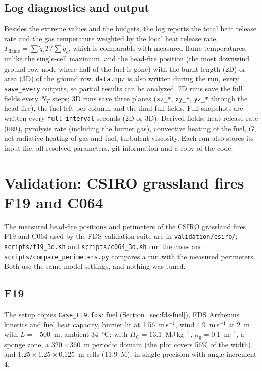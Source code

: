 \documentclass[11pt,a4paper]{article}
\newcommand{\code}[1]{\texttt{#1}}
\begin{document}
\subsection{Log diagnostics and output}
Besides the extreme values and the budgets, the log reports the total heat release rate and the gas
temperature weighted by the local heat release rate, $T_\text{flame}=\sum\dot q_\text{c} T/\sum\dot q_\text{c}$, which is
comparable with measured flame temperatures, unlike the single-cell maximum, and the head-fire position
(the most downwind ground-row node where half of the fuel is gone) with the burnt length (2D) or area (3D)
of the ground row. \code{data.npz} is also written during the run, every \code{save\_every} outputs, so
partial results can be analyzed. 2D runs save the full
fields every $N_T$ steps; 3D runs save three planes (\code{xz\_*}, \code{xy\_*}, \code{yz\_*} through the
head fire), the fuel left per column and the final full fields. Full snapshots are written every
\code{full\_interval} seconds (2D or 3D). Derived fields: heat release rate (\code{HRR}), pyrolysis
rate (including the burner gas), convective heating of the fuel, $G$, net radiative heating of gas and
fuel, turbulent viscosity. Each run also stores its input file, all resolved parameters, git
information and a copy of the code.

\section{Validation: CSIRO grassland fires F19 and C064}\label{sec:validation}
The measured head-fire positions and perimeters of the CSIRO grassland fires F19 and C064 used by the FDS
validation suite are in \code{validation/csiro/}; \code{scripts/f19\_3d.sh} and \code{scripts/c064\_3d.sh}
run the cases and \code{scripts/compare\_perimeters.py} compares a run with the measured perimeters. Both
use the same model settings, and nothing was tuned.

\subsection{F19}
The setup copies \code{Case\_F19.fds}: fuel
(Section~\ref{sec:fds-fuel}), FDS Arrhenius kinetics and fuel heat capacity, burner lit at 1.56~m\,s$^{-1}$, wind
4.9~m\,s$^{-1}$ at 2~m with $L=-500$~m, ambient 34~$^\circ$C; with $H_\text{C}=13.1$~MJ\,kg$^{-1}$, $\kappa_\text{g}=0.1$~m$^{-1}$, a
sponge zone, a $320\times360$~m periodic domain (the plot covers 56\% of the width) and
$1.25\times1.25\times0.125$~m cells (11.9~M), in single precision with angle increment 4.
\end{document}
